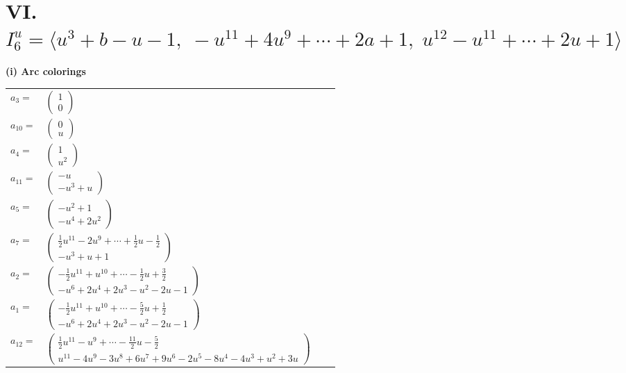 \documentclass[1p]{elsarticle_modified}
\theoremstyle{definition}
\begin{document}
\centering \section*{VI. $I^u_{6}= \langle u^3+b- u-1,\;- u^{11}+4 u^9+\cdots+2 a+1,\;u^{12}- u^{11}+\cdots+2 u+1 \rangle$}
\flushleft \textbf{(i) Arc colorings}\\
\begin{tabular}{m{7pt} m{180pt} m{7pt} m{180pt} }
\flushright $a_{3}=$&$\begin{pmatrix}1\\0\end{pmatrix}$ \\
\flushright $a_{10}=$&$\begin{pmatrix}0\\u\end{pmatrix}$ \\
\flushright $a_{4}=$&$\begin{pmatrix}1\\u^2\end{pmatrix}$ \\
\flushright $a_{11}=$&$\begin{pmatrix}- u\\- u^3+u\end{pmatrix}$ \\
\flushright $a_{5}=$&$\begin{pmatrix}- u^2+1\\- u^4+2 u^2\end{pmatrix}$ \\
\flushright $a_{7}=$&$\begin{pmatrix}\frac{1}{2} u^{11}-2 u^9+\cdots+\frac{1}{2} u-\frac{1}{2}\\- u^3+u+1\end{pmatrix}$ \\
\flushright $a_{2}=$&$\begin{pmatrix}-\frac{1}{2} u^{11}+u^{10}+\cdots-\frac{1}{2} u+\frac{3}{2}\\- u^6+2 u^4+2 u^3- u^2-2 u-1\end{pmatrix}$ \\
\flushright $a_{1}=$&$\begin{pmatrix}-\frac{1}{2} u^{11}+u^{10}+\cdots-\frac{5}{2} u+\frac{1}{2}\\- u^6+2 u^4+2 u^3- u^2-2 u-1\end{pmatrix}$ \\
\flushright $a_{12}=$&$\begin{pmatrix}\frac{1}{2} u^{11}- u^9+\cdots-\frac{11}{2} u-\frac{5}{2}\\u^{11}-4 u^9-3 u^8+6 u^7+9 u^6-2 u^5-8 u^4-4 u^3+u^2+3 u\end{pmatrix}$ \\

\end{tabular}
\end{document}
